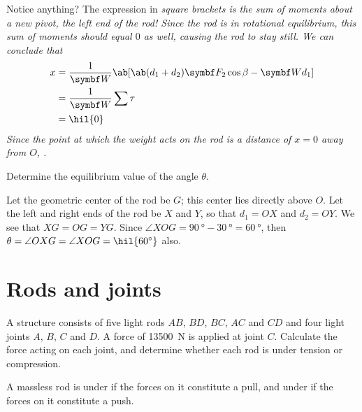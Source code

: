 Notice anything? The expression in \it{square brackets} is the sum of moments
about a new pivot, the left end of the rod! Since the rod is in
rotational equilibrium,
this sum of moments should equal \(0\) as well, causing the rod to stay still.
We can conclude that
\begin{align*}
  x &= \f{1}{\mv{W}} \ab[\ab(d_1+d_2)\mv{F}_2\cos\beta - \mv{W}d_1] \\
  &= \f{1}{\mv{W}} \sum\tau \\
  &= \hil{0}
\end{align*}
Since the point at which the weight acts on the rod is a distance of \(x = 0\)
away from \(O\), .

\begin{problem}
  Determine the equilibrium value of the angle \(\theta\).
\end{problem}
Let the geometric center of the rod be \(G\); this center lies
directly above \(O\).  Let the left and right ends of the rod be
\(X\) and \(Y\), so that \(d_1 = OX\) and \(d_2 = OY\).  We see that
\(XG = OG = YG\). Since \(\angle XOG =
\qty{90}{\degree}-\qty{30}{\degree}=\qty{60}{\degree}\), then
\(\theta=\angle OXG = \angle XOG = \hil{ \qty{60}{\degree} }\) also.

\section{Rods and joints}
\begin{problem}
  A structure consists of five light rods \(AB\), $BD$, $BC$, $AC$
  and $CD$ and four light joints \(A\), \(B\), \(C\) and \(D\). A
  force of \qty{13500}{\newton} is applied at joint \(C\). Calculate
  the force acting on each joint, and determine whether each rod is
  under tension or compression.
\end{problem}
A massless rod is under  if the forces on it constitute
a pull, and under  if the forces on it constitute a push.

